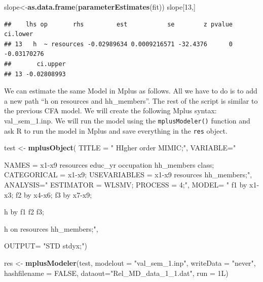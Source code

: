 \documentclass[]{book}
\newenvironment{Shaded}{\begin{snugshade}}{\end{snugshade}}
\newcommand{\DataTypeTok}[1]{\textcolor[rgb]{0.13,0.29,0.53}{#1}}
\newcommand{\DecValTok}[1]{\textcolor[rgb]{0.00,0.00,0.81}{#1}}
\newcommand{\KeywordTok}[1]{\textcolor[rgb]{0.13,0.29,0.53}{\textbf{#1}}}
\newcommand{\NormalTok}[1]{#1}
\newcommand{\OtherTok}[1]{\textcolor[rgb]{0.56,0.35,0.01}{#1}}
\newcommand{\StringTok}[1]{\textcolor[rgb]{0.31,0.60,0.02}{#1}}
\begin{document}
\begin{Shaded}
\begin{Highlighting}[]
\NormalTok{slope<-}\KeywordTok{as.data.frame}\NormalTok{(}\KeywordTok{parameterEstimates}\NormalTok{(fit))}
\NormalTok{slope[}\DecValTok{13}\NormalTok{,]}
\end{Highlighting}
\end{Shaded}

\begin{verbatim}
##    lhs op       rhs         est           se        z pvalue    ci.lower
## 13   h  ~ resources -0.02989634 0.0009216571 -32.4376      0 -0.03170276
##       ci.upper
## 13 -0.02808993
\end{verbatim}

We can estimate the same Model in Mplus as follows. All we have to do is to add a new path ``h on resources and hh\_members''. The rest of the script is similar to the previous CFA model. We will create the following Mplus syntax: val\_sem\_1.inp. We will run the model using the \texttt{mplusModeler()} function and ask R to run the model in Mplus and save everything in the \texttt{res} object.

\begin{Shaded}
\begin{Highlighting}[]
\NormalTok{test <-}\StringTok{ }\KeywordTok{mplusObject}\NormalTok{(}
\DataTypeTok{TITLE =} \StringTok{"}
\StringTok{HIgher order MIMIC;"}\NormalTok{,}
\DataTypeTok{VARIABLE=}\StringTok{"}

\StringTok{     NAMES = x1-x9 resources educ_yr occupation hh_members class;}
\StringTok{     CATEGORICAL = x1-x9;}
\StringTok{     USEVARIABLES = x1-x9 resources hh_members;"}\NormalTok{,}
\DataTypeTok{ANALYSIS=}\StringTok{"}
\StringTok{ESTIMATOR = WLSMV;}
\StringTok{              PROCESS = 4;"}\NormalTok{,}
\DataTypeTok{MODEL=} \StringTok{"}
\StringTok{f1 by x1-x3;}
\StringTok{  f2 by x4-x6;}
\StringTok{  f3 by x7-x9;}

\StringTok{h by f1 f2 f3;}

\StringTok{h on resources hh_members;"}\NormalTok{,}

\DataTypeTok{OUTPUT=}
\StringTok{"STD stdyx;"}\NormalTok{)}

\NormalTok{res <-}\StringTok{ }\KeywordTok{mplusModeler}\NormalTok{(test, }\DataTypeTok{modelout =} \StringTok{"val_sem_1.inp"}\NormalTok{,}
                    \DataTypeTok{writeData =} \StringTok{"never"}\NormalTok{,}
                    \DataTypeTok{hashfilename =} \OtherTok{FALSE}\NormalTok{,}
                    \DataTypeTok{dataout=}\StringTok{"Rel_MD_data_1_1.dat"}\NormalTok{, }\DataTypeTok{run =}\NormalTok{ 1L)}
\end{Highlighting}
\end{Shaded}
\end{document}
